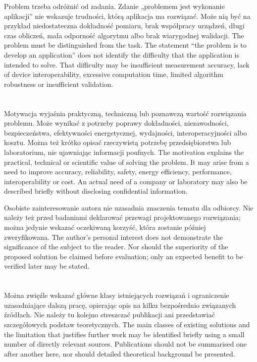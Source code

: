 \ploren
  {Problem trzeba odróżnić od zadania. Zdanie „problemem jest wykonanie aplikacji” nie wskazuje trudności, którą aplikacja ma rozwiązać. Może nią być na przykład niedostateczna dokładność pomiaru, brak współpracy urządzeń, długi czas obliczeń, mała odporność algorytmu albo brak wiarygodnej walidacji.}
  {The problem must be distinguished from the task. The statement “the problem is to develop an application” does not identify the difficulty that the application is intended to solve. That difficulty may be insufficient measurement accuracy, lack of device interoperability, excessive computation time, limited algorithm robustness or insufficient validation.}

\section{}

\ploren
  {Motywacja wyjaśnia praktyczną, techniczną lub poznawczą wartość rozwiązania problemu. Może wynikać z potrzeby poprawy dokładności, niezawodności, bezpieczeństwa, efektywności energetycznej, wydajności, interoperacyjności albo kosztu. Można też krótko opisać rzeczywistą potrzebę przedsiębiorstwa lub laboratorium, nie ujawniając informacji poufnych.}
  {The motivation explains the practical, technical or scientific value of solving the problem. It may arise from a need to improve accuracy, reliability, safety, energy efficiency, performance, interoperability or cost. An actual need of a company or laboratory may also be described briefly without disclosing confidential information.}

\ploren
  {Osobiste zainteresowanie autora nie uzasadnia znaczenia tematu dla odbiorcy. Nie należy też przed badaniami deklarować przewagi projektowanego rozwiązania; można jedynie wskazać oczekiwaną korzyść, która zostanie później zweryfikowana.}
  {The author's personal interest does not demonstrate the significance of the subject to the reader. Nor should the superiority of the proposed solution be claimed before evaluation; only an expected benefit to be verified later may be stated.}

\section{}

\ploren
  {Można zwięźle wskazać główne klasy istniejących rozwiązań i ograniczenie uzasadniające dalszą pracę, opierając opis na kilku bezpośrednio związanych źródłach. Nie należy tu kolejno streszczać publikacji ani przedstawiać szczegółowych podstaw teoretycznych.}
  {The main classes of existing solutions and the limitation that justifies further work may be identified briefly using a small number of directly relevant sources. Publications should not be summarised one after another here, nor should detailed theoretical background be presented.}

